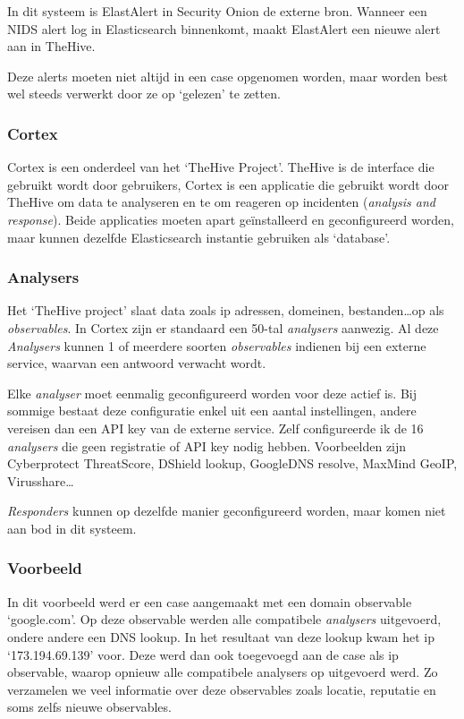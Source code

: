 \documentclass[a4paper,12pt]{report}
\begin{document}
In dit systeem is ElastAlert in Security Onion de externe bron.
Wanneer een NIDS alert log in Elasticsearch binnenkomt, maakt ElastAlert een nieuwe alert aan in TheHive.

Deze alerts moeten niet altijd in een case opgenomen worden, maar worden best wel steeds verwerkt door ze op `gelezen' te zetten.

\subsubsection{Cortex}
\label{sec:cortex}
Cortex is een onderdeel van het `TheHive Project'.
TheHive is de interface die gebruikt wordt door gebruikers, Cortex is een applicatie die gebruikt wordt door TheHive om data te analyseren en te om reageren op incidenten (\emph{analysis and response}).
Beide applicaties moeten apart geïnstalleerd en geconfigureerd worden, maar kunnen dezelfde Elasticsearch instantie gebruiken als `database'.

\subsubsection{Analysers}
Het `TheHive project' slaat data zoals ip adressen, domeinen, bestanden\dots op als \emph{observables}.
In Cortex zijn er standaard een 50-tal \emph{analysers} aanwezig.
Al deze \emph{Analysers} kunnen 1 of meerdere soorten \emph{observables} indienen bij een externe service, waarvan een antwoord verwacht wordt.

Elke \emph{analyser} moet eenmalig geconfigureerd worden voor deze actief is.
Bij sommige bestaat deze configuratie enkel uit een aantal instellingen, andere vereisen dan een API key van de externe service.
Zelf configureerde ik de 16 \emph{analysers} die geen registratie of API key nodig hebben.
Voorbeelden zijn Cyberprotect ThreatScore, DShield lookup, GoogleDNS resolve, MaxMind GeoIP, Virusshare\dots

\emph{Responders} kunnen op dezelfde manier geconfigureerd worden, maar komen niet aan bod in dit systeem.

\subsubsection{Voorbeeld}
In dit voorbeeld werd er een case aangemaakt met een domain observable `google.com'.
Op deze observable werden alle compatibele \emph{analysers} uitgevoerd, ondere andere een DNS lookup.
In het resultaat van deze lookup kwam het ip `173.194.69.139' voor.
Deze werd dan ook toegevoegd aan de case als ip observable, waarop opnieuw alle compatibele analysers op uitgevoerd werd.
Zo verzamelen we veel informatie over deze observables zoals locatie, reputatie en soms zelfs nieuwe observables.
\end{document}
